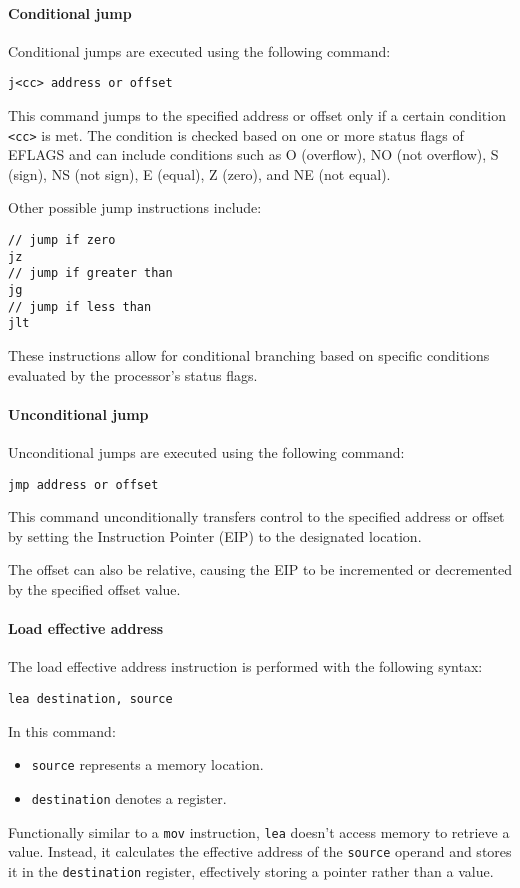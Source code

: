 \paragraph*{Conditional jump}
Conditional jumps are executed using the following command:
\begin{verbatim}
j<cc> address or offset
\end{verbatim}
This command jumps to the specified address or offset only if a certain condition \texttt{<cc>} is met. 
The condition is checked based on one or more status flags of EFLAGS and can include conditions such as O (overflow), NO (not overflow), S (sign), NS (not sign), E (equal), Z (zero), and NE (not equal).

Other possible jump instructions include:
\begin{verbatim}
// jump if zero
jz
// jump if greater than
jg
// jump if less than
jlt
\end{verbatim}
These instructions allow for conditional branching based on specific conditions evaluated by the processor's status flags.

\paragraph*{Unconditional jump}
Unconditional jumps are executed using the following command:
\begin{verbatim}
jmp address or offset
\end{verbatim}
This command unconditionally transfers control to the specified address or offset by setting the Instruction Pointer (EIP) to the designated location.

The offset can also be relative, causing the EIP to be incremented or decremented by the specified offset value.

\paragraph*{Load effective address}
The load effective address instruction is performed with the following syntax:
\begin{verbatim}
lea destination, source
\end{verbatim}
In this command:
\begin{itemize}
    \item \texttt{source} represents a memory location.
    \item \texttt{destination} denotes a register.
\end{itemize}
Functionally similar to a \texttt{mov} instruction, \texttt{lea} doesn't access memory to retrieve a value.
Instead, it calculates the effective address of the \texttt{source} operand and stores it in the \texttt{destination} register, effectively storing a pointer rather than a value.

